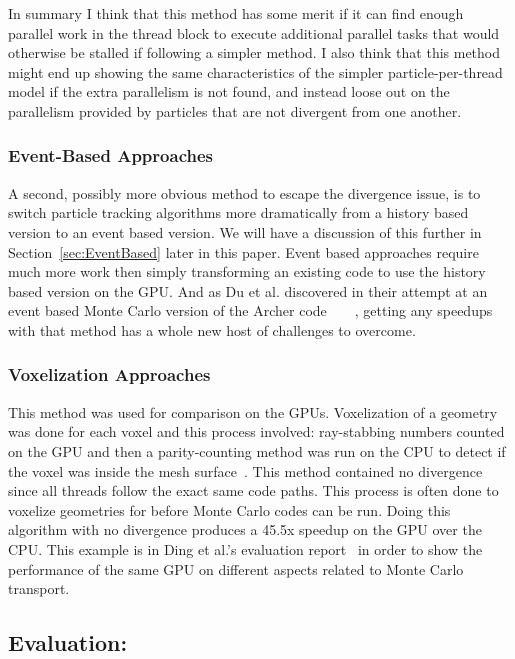 In summary I think that this method has some merit if it can find enough parallel work in the thread block to execute additional parallel tasks that would otherwise be stalled if following a simpler method.
%
I also think that this method might end up showing the same characteristics of the simpler particle-per-thread model if the extra parallelism is not found, and instead loose out on the parallelism provided by particles that are not divergent from one another. 

\subsubsection*{\textbf{Event-Based Approaches}}

A second, possibly more obvious method to escape the divergence issue, is to switch particle tracking algorithms more dramatically from a history based version to an event based version.
%
We will have a discussion of this further in Section~\ref{sec:EventBased} later in this paper.
%
Event based approaches require much more work then simply transforming an existing code to use the history based version on the GPU.
%
And as Du et al. discovered in their attempt at an event based Monte Carlo version of the Archer code~\cite{xu2015archer}~\cite{du2013evaluation}~\cite{liu2015comparison}~\cite{su2013monte},  getting any speedups with that method has a whole new host of challenges to overcome.

\subsubsection*{\textbf{Voxelization Approaches}}

This method was used for comparison on the GPUs.
%
Voxelization of a geometry was done for each voxel and this process involved: ray-stabbing numbers counted on the GPU and then a parity-counting method was run on the CPU to detect if the voxel was inside the mesh surface~\cite{na2010deformable}.
%
This method contained no divergence since all threads follow the exact same code paths.
%
This process is often done to voxelize geometries for before Monte Carlo codes can be run.
%
Doing this algorithm with no divergence produces a 45.5x speedup on the GPU over the CPU.
%
This example is in Ding et al.'s evaluation report~\cite{ding2011evaluation} in order to show the performance of the same GPU on different aspects related to Monte Carlo transport.

\subsection*{ \textbf{Evaluation:}}

